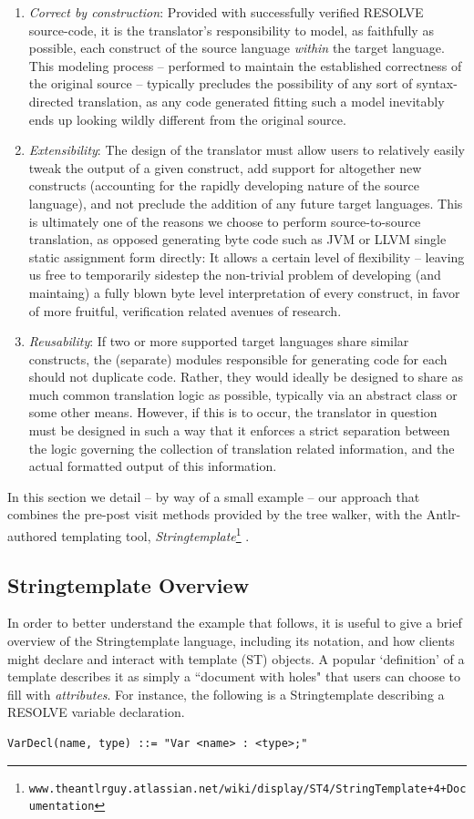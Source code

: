 \documentclass[times]{speauth}
\begin{document}
\begin{enumerate}
\item \textit{Correct by construction}: Provided with successfully verified RESOLVE source-code, it is the translator's responsibility to model, as faithfully as possible, each construct of the source language \textit{within} the target language. This modeling process -- performed to maintain the established correctness of the original source -- typically precludes the possibility of any sort of syntax-directed translation, as any code generated fitting such a model inevitably ends up looking wildly different from the original source.
\item \textit{Extensibility}: The design of the translator must allow users to relatively easily tweak the output of a given construct, add support for altogether new constructs (accounting for the rapidly developing nature of the source language), and not preclude the addition of any future target languages. This is ultimately one of the reasons we choose to perform source-to-source translation, as opposed generating byte code such as JVM or LLVM single static assignment form directly: It allows a certain level of flexibility -- leaving us free to temporarily sidestep the non-trivial problem of developing (and maintaing) a fully blown byte level interpretation of every construct, in favor of more fruitful, verification related avenues of research.
\item \textit{Reusability}: If two or more supported target languages share similar constructs, the (separate) modules responsible for generating code for each should not duplicate code. Rather, they would ideally be designed to share as much common translation logic as possible, typically via an abstract class or some other means. However, if this is to occur, the translator in question must be designed in such a way that it enforces a strict separation between the logic governing the collection of translation related information, and the actual formatted output of this information.
\end{enumerate}

In this section we detail -- by way of a small example -- our approach that combines the pre-post visit methods provided by the tree walker, with the Antlr-authored templating tool, \textit{Stringtemplate}\footnote[3]{\texttt{www.theantlrguy.atlassian.net/wiki/display/ST4/StringTemplate+4+Documentation}} \cite{parr:2006}.

\subsection{Stringtemplate Overview}
In order to better understand the example that follows, it is useful to give a brief overview of the Stringtemplate language, including its notation, and how clients might declare and interact with template (ST) objects. A popular `definition' of a template describes it as simply a ``document with holes" that users can choose to fill with \textit{attributes}. For instance, the following is a Stringtemplate describing a RESOLVE variable declaration.
\begin{lstlisting}
VarDecl(name, type) ::= "Var <name> : <type>;"
\end{lstlisting}
\end{document}
